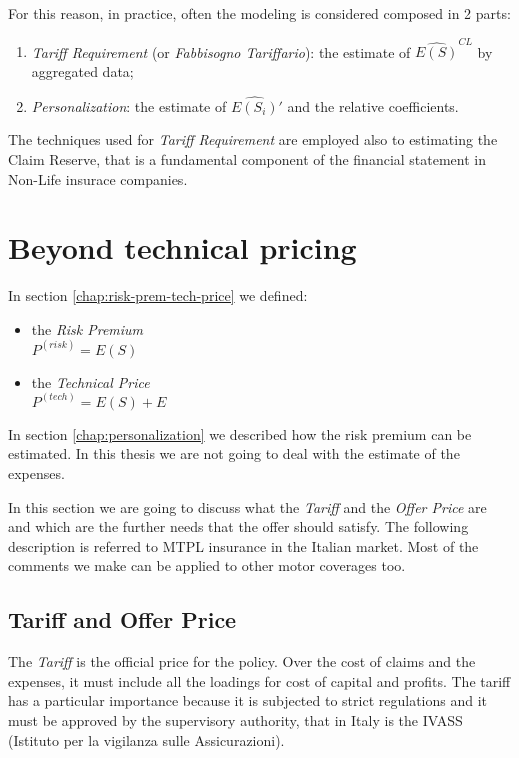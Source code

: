 \documentclass[a4paper, nobind]{templates/ociamthesis}
\providecommand{\tightlist}{%
  \setlength{\itemsep}{0pt}\setlength{\parskip}{0pt}}
\theoremstyle{definition}
\theoremstyle{definition}
\theoremstyle{definition}
\theoremstyle{remark}
\begin{document}
For this reason, in practice, often the modeling is considered composed in 2 parts:

\begin{enumerate}
\def\labelenumi{\arabic{enumi}.}
\tightlist
\item
  \emph{Tariff Requirement} (or \emph{Fabbisogno Tariffario}): the estimate of \(\widehat{E(S)}^{CL}\) by aggregated data;
\item
  \emph{Personalization}: the estimate of \(\widehat{E(S_i)}'\) and the relative coefficients.
\end{enumerate}

The techniques used for \emph{Tariff Requirement} are employed also to estimating the Claim Reserve, that is a fundamental component of the financial statement in Non-Life insurace companies.

\hypertarget{beyond-technical-pricing}{%
\section{Beyond technical pricing}\label{beyond-technical-pricing}}

In section \ref{chap:risk-prem-tech-price} we defined:

\begin{itemize}
\tightlist
\item
  the \emph{Risk Premium}\\
  \(P^{(risk)} = E(S)\)
\item
  the \emph{Technical Price}\\
  \(P^{(tech)} = E(S) + E\)
\end{itemize}

In section \ref{chap:personalization} we described how the risk premium can be estimated. In this thesis we are not going to deal with the estimate of the expenses.

In this section we are going to discuss what the \emph{Tariff} and the \emph{Offer Price} are and which are the further needs that the offer should satisfy. The following description is referred to MTPL insurance in the Italian market. Most of the comments we make can be applied to other motor coverages too.

\hypertarget{tariff-and-offer-price}{%
\subsection{Tariff and Offer Price}\label{tariff-and-offer-price}}

The \emph{Tariff} is the official price for the policy. Over the cost of claims and the expenses, it must include all the loadings for cost of capital and profits. The tariff has a particular importance because it is subjected to strict regulations and it must be approved by the supervisory authority, that in Italy is the IVASS (Istituto per la vigilanza sulle Assicurazioni).
\end{document}
